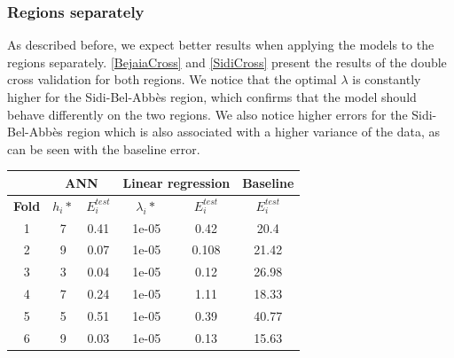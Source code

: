\documentclass[10pt]{article}
\numberwithin{equation}{section}
\numberwithin{figure}{section}
\numberwithin{table}{section}
\begin{document}
\subsubsection{Regions separately}

As described before, we expect better results when applying the models to the regions separately. \autoref{BejaiaCross} and \autoref{SidiCross} present the results of the double cross validation for both regions. We notice that the optimal $\lambda$ is constantly higher for the Sidi-Bel-Abbès region, which confirms that the model should behave differently on the two regions. We also notice higher errors for the Sidi-Bel-Abbès region which is also associated with a higher variance of the data, as can be seen with the baseline error.

\begin{table}[H]
\centering
\begin{tabular}{c|c|c|c|c|c|}
\cline{2-6}
\multicolumn{1}{l|}{\textbf{}}      & \multicolumn{2}{c|}{\textbf{ANN}}       & \multicolumn{2}{c|}{\textbf{Linear regression}} & \textbf{Baseline}     \\ \hline
\multicolumn{1}{|c|}{\textbf{Fold}} & \textbf{$h_i*$} & \textbf{$E_i^{test}$} & \textbf{$\lambda_i*$}  & \textbf{$E_i^{test}$}  & \textbf{$E_i^{test}$} \\ \hline
\multicolumn{1}{|c|}{1}             & 7               & 0.41                  & 1e-05                     & 0.42                   & 20.4                  \\ \hline
\multicolumn{1}{|c|}{2}             & 9               & 0.07                   & 1e-05                   & 0.108                   & 21.42                  \\ \hline
\multicolumn{1}{|c|}{3}             & 3               & 0.04                  & 1e-05                     & 0.12                     & 26.98                  \\ \hline
\multicolumn{1}{|c|}{4}             & 7               & 0.24                  & 1e-05                  & 1.11                     & 18.33                  \\ \hline
\multicolumn{1}{|c|}{5}             & 5               & 0.51                  & 1e-05                    & 0.39                   & 40.77                  \\ \hline
\multicolumn{1}{|c|}{6}             & 9               & 0.03                  & 1e-05                    & 0.13                   & 15.63                  \\ \hline

\end{tabular}
\end{table}
\end{document}
